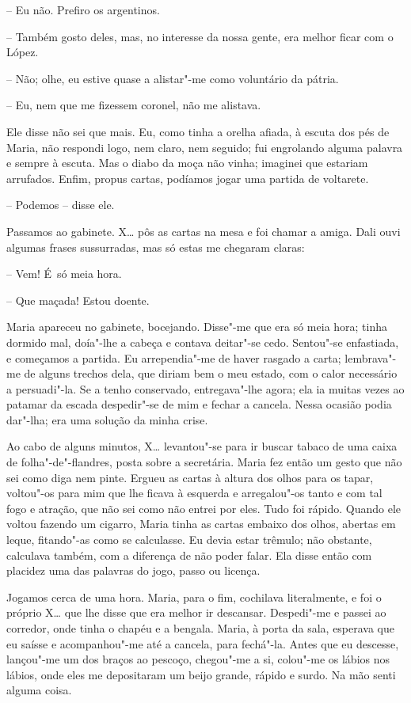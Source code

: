 -- Eu não. Prefiro os argentinos.

-- Também gosto deles, mas, no interesse da nossa gente, era melhor
ficar com o López.

-- Não; olhe, eu estive quase a alistar"-me como voluntário da pátria.

-- Eu, nem que me fizessem coronel, não me alistava.

Ele disse não sei que mais. Eu, como tinha a orelha afiada, à escuta dos
pés de Maria, não respondi logo, nem claro, nem seguido; fui engrolando
alguma palavra e sempre à escuta. Mas o diabo da moça não vinha;
imaginei que estariam arrufados. Enfim, propus cartas, podíamos jogar
uma partida de voltarete.

-- Podemos -- disse ele.

Passamos ao gabinete. X\ldots{} pôs as cartas na mesa e foi chamar a amiga.
Dali ouvi algumas frases sussurradas, mas só estas me chegaram claras:

-- Vem! É~só meia hora.

-- Que maçada! Estou doente.

Maria apareceu no gabinete, bocejando. Disse"-me que era só meia hora;
tinha dormido mal, doía"-lhe a cabeça e contava deitar"-se cedo. Sentou"-se
enfastiada, e começamos a partida. Eu arrependia"-me de haver rasgado a
carta; lembrava"-me de alguns trechos dela, que diriam bem o meu estado,
com o calor necessário a persuadi"-la. Se a tenho conservado,
entregava"-lhe agora; ela ia muitas vezes ao patamar da escada
despedir"-se de mim e fechar a cancela. Nessa ocasião podia dar"-lha; era
uma solução da minha crise.

Ao cabo de alguns minutos, X\ldots{} levantou"-se para ir buscar tabaco de uma
caixa de folha"-de"-flandres, posta sobre a secretária. Maria fez então um
gesto que não sei como diga nem pinte. Ergueu as cartas à altura dos
olhos para os tapar, voltou"-os para mim que lhe ficava à esquerda e
arregalou"-os tanto e com tal fogo e atração, que não sei como não entrei
por eles. Tudo foi rápido. Quando ele voltou fazendo um cigarro, Maria
tinha as cartas embaixo dos olhos, abertas em leque, fitando"-as como se
calculasse. Eu devia estar trêmulo; não obstante, calculava também, com
a diferença de não poder falar. Ela disse então com placidez uma das
palavras do jogo, passo ou licença.

Jogamos cerca de uma hora. Maria, para o fim, cochilava literalmente, e
foi o próprio X\ldots{} que lhe disse que era melhor ir descansar. Despedi"-me
e passei ao corredor, onde tinha o chapéu e a bengala. Maria, à porta da
sala, esperava que eu saísse e acompanhou"-me até a cancela, para
fechá"-la. Antes que eu descesse, lançou"-me um dos braços ao pescoço,
chegou"-me a si, colou"-me os lábios nos lábios, onde eles me depositaram
um beijo grande, rápido e surdo. Na mão senti alguma coisa.

